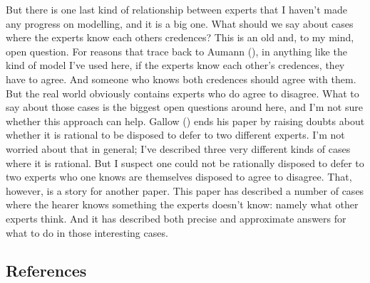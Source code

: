 \documentclass[
  10pt,
  letterpaper,
  DIV=11,
  numbers=noendperiod,
  twoside]{scrartcl}
\begin{document}
But there is one last kind of relationship between experts that I
haven't made any progress on modelling, and it is a big one. What should
we say about cases where the experts know each others credences? This is
an old and, to my mind, open question. For reasons that trace back to
Aumann (), in anything like the kind of
model I've used here, if the experts know each other's credences, they
have to agree. And someone who knows both credences should agree with
them. But the real world obviously contains experts who do agree to
disagree. What to say about those cases is the biggest open questions
around here, and I'm not sure whether this approach can help. Gallow
() ends his paper by raising doubts about
whether it is rational to be disposed to defer to two different experts.
I'm not worried about that in general; I've described three very
different kinds of cases where it is rational. But I suspect one could
not be rationally disposed to defer to two experts who one knows are
themselves disposed to agree to disagree. That, however, is a story for
another paper. This paper has described a number of cases where the
hearer knows something the experts doesn't know: namely what other
experts think. And it has described both precise and approximate answers
for what to do in those interesting cases.

\subsection*{References}\label{references}
\end{document}
